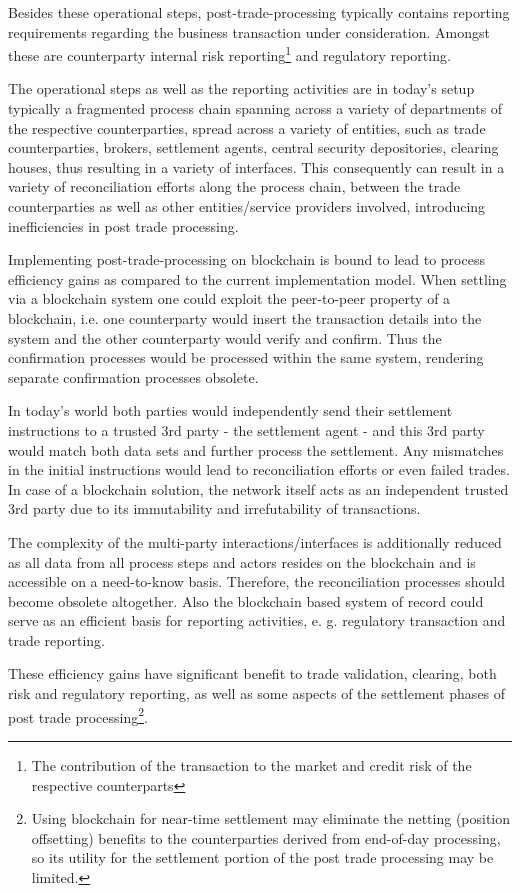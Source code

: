 Besides these operational steps, post-trade-processing typically contains reporting requirements regarding the business transaction under consideration. Amongst these are counterparty internal risk reporting\footnote{The contribution of the transaction to the market and credit risk of the respective counterparts} and regulatory reporting. 

The operational steps as well as the reporting activities are in today’s setup typically a fragmented process chain spanning across a variety of departments of the respective counterparties, spread across a variety of entities, such as trade counterparties, brokers, settlement agents, central security depositories, clearing houses, thus resulting in a variety of interfaces. This consequently can result in a variety of reconciliation efforts along the process chain, between the trade counterparties as well as other entities/service providers involved, introducing inefficiencies in post trade processing.

Implementing post-trade-processing on blockchain is bound to lead to process efficiency gains as compared to the current implementation model. When settling via a blockchain system one could exploit the peer-to-peer property of a blockchain, i.e. one counterparty would insert the transaction details into the system and the other counterparty would verify and confirm.  Thus the confirmation processes would be processed within the same system, rendering separate confirmation processes obsolete.

In today's world both parties would independently send their settlement instructions to a trusted 3rd party - the settlement agent - and this 3rd party would match both data sets and further process the settlement. Any mismatches in the initial instructions would lead to reconciliation efforts or even failed trades. In case of a blockchain solution, the network itself acts as an independent trusted 3rd party due to its immutability and irrefutability of transactions.

The complexity of the multi-party interactions/interfaces is additionally reduced as all data from all process steps and actors resides on the blockchain and is accessible on a need-to-know basis. Therefore, the reconciliation processes should become obsolete altogether. Also the blockchain based system of record could serve as an efficient basis for reporting activities, e. g. regulatory transaction and trade reporting.

These efficiency gains have significant benefit to trade validation, clearing, both risk and regulatory reporting, as well as some aspects of the settlement phases of post trade processing\footnote{Using blockchain for near-time settlement may eliminate the netting (position offsetting) benefits to the counterparties derived from end-of-day processing, so its utility for the settlement portion of the post trade processing may be limited.}.

